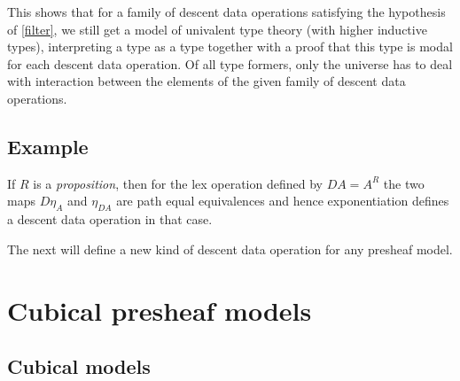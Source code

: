 \documentclass[10pt,a4paper,draft]{article}
\newcommand{\D}{D}              %
\renewcommand{\~}{\widetilde}
\theoremstyle{definition}
\theoremstyle{remark} %
\begin{document}
This shows that for a family of descent data operations satisfying the hypothesis of \cref{filter},
we still get a model of univalent type theory (with higher inductive types), interpreting a type
as a type together with a proof that this type is modal for each descent data operation.
Of all type formers, only the universe has to deal with interaction between the elements of the given family of descent data operations.

\subsection{Example}\label{exp}

If $R$ is a {\em proposition}, then for the lex operation defined by $\D A = A^R$ the two maps
$\D\eta_A$ and $\eta_{\D A}$ are path equal equivalences and hence exponentiation
defines a descent data operation in that case.

 The next  will define a new kind of descent data operation for any presheaf model.


\section{Cubical presheaf models}\label{sec:presheaf-models}

\subsection{Cubical models}\label{cubical-sets}
\end{document}
